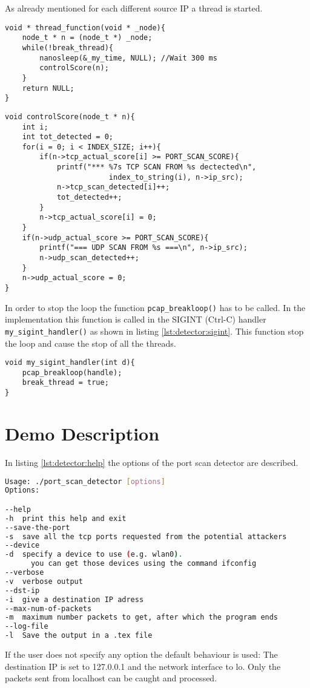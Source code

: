 As already mentioned for each different source IP a thread is started.
\begin{lstlisting}[style=MyC]
void * thread_function(void * _node){	
	node_t * n = (node_t *) _node;
	while(!break_thread){
		nanosleep(&_my_time, NULL); //Wait 300 ms
		controlScore(n);
	}
	return NULL;
}
\end{lstlisting}

\begin{lstlisting}[style=MyC]
void controlScore(node_t * n){
	int i;
	int tot_detected = 0;
	for(i = 0; i < INDEX_SIZE; i++){
		if(n->tcp_actual_score[i] >= PORT_SCAN_SCORE){
			printf("*** %7s TCP SCAN FROM %s dectected\n",
						index_to_string(i), n->ip_src);
			n->tcp_scan_detected[i]++;
			tot_detected++;
		}
		n->tcp_actual_score[i] = 0;
	}
	if(n->udp_actual_score >= PORT_SCAN_SCORE){
		printf("=== UDP SCAN FROM %s ===\n", n->ip_src);
		n->udp_scan_detected++;
	}
	n->udp_actual_score = 0;
}
\end{lstlisting}


In order to stop the loop the function \lstinline|pcap_breakloop()| has to be called.
In the implementation this function is called in the SIGINT (Ctrl-C) handler \lstinline|my_sigint_handler()| as shown
in listing \ref{lst:detector:sigint}. This function stop the loop and cause the stop of all the threads.
\begin{lstlisting}[style=MyC, caption=Handler that process the SIGINT signal., label=lst:detector:sigint]
void my_sigint_handler(int d){
	pcap_breakloop(handle);
	break_thread = true;
}
\end{lstlisting}



\section{Demo Description}
In listing \ref{lst:detector:help} the options of the port scan detector are described.
\begin{lstlisting}[frame=single, language=BASH, label=lst:detector:help, caption=Help page of the port scan detector.]
Usage: ./port_scan_detector [options]
Options:

--help
-h	print this help and exit
--save-the-port
-s	save all the tcp ports requested from the potential attackers
--device
-d	specify a device to use (e.g. wlan0). 
	  you can get those devices using the command ifconfig
--verbose
-v	verbose output
--dst-ip
-i	give a destination IP adress
--max-num-of-packets
-m	maximum number packets to get, after which the program ends
--log-file
-l	Save the output in a .tex file
\end{lstlisting}
If the user does not specify any option the default behaviour is used:
The destination IP is set to 127.0.0.1 and the network interface to lo. Only
the packets sent from localhost can be caught and processed.

